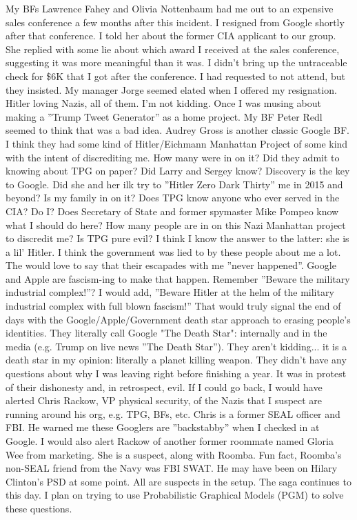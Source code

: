 \documentclass{article}
\begin{document}
\begin{multicols}{2}
My BFs Lawrence Fahey and Olivia Nottenbaum had me out to an expensive sales conference a few months after this incident. I resigned from Google shortly after that conference. I told her about the former CIA applicant to our group. She replied with some lie about which award I received at the sales conference, suggesting it was more meaningful than it was. I didn't bring up the untraceable check for \$6K that I got after the conference. I had requested to not attend, but they insisted. My manager Jorge seemed elated when I offered my resignation. Hitler loving Nazis, all of them. I'm not kidding. Once I was musing about making a ''Trump Tweet Generator'' as a home project. My BF Peter Redl seemed to think that was a bad idea. Audrey Gross is another classic Google BF. I think they had some kind of Hitler/Eichmann Manhattan Project of some kind with the intent of discrediting me. How many were in on it? Did they admit to knowing about TPG on paper? Did Larry and Sergey know? Discovery is the key to Google. Did she and her ilk try to ''Hitler Zero Dark Thirty'' me in 2015 and beyond? Is my family in on it? Does TPG know anyone who ever served in the CIA? Do I? Does Secretary of State and former spymaster Mike Pompeo know what I should do here? How many people are in on this Nazi Manhattan project to discredit me? Is TPG pure evil? I think I know the answer to the latter: she is a lil' Hitler. I think the government was lied to by these people about me a lot. The would love to say that their escapades with me ''never happened''. Google and Apple are fascism-ing to make that happen. Remember ''Beware the military industrial complex!''? I would add, ''Beware Hitler at the helm of the military industrial complex with full blown fascism!'' That would truly signal the end of days with the Google/Apple/Government death star approach to erasing people's identities. They literally call Google "The Death Star": internally and in the media (e.g. Trump on live news ''The Death Star''). They aren't kidding... it is a death star in my opinion: literally a planet killing weapon. They didn't have any questions about why I was leaving right before finishing a year. It was in protest of their dishonesty and, in retrospect, evil. If I could go back, I would have alerted Chris Rackow, VP physical security, of the Nazis that I suspect are running around his org, e.g. TPG, BFs, etc. Chris is a former SEAL officer and FBI. He warned me these Googlers are ''backstabby'' when I checked in at Google. I would also alert Rackow of another former roommate named Gloria Wee from marketing. She is a suspect, along with Roomba. Fun fact, Roomba's non-SEAL friend from the Navy was FBI SWAT. He may have been on Hilary Clinton's PSD at some point. All are suspects in the setup. The saga continues to this day. I plan on trying to use Probabilistic Graphical Models (PGM) to solve these questions. 


\end{multicols}
\end{document}
